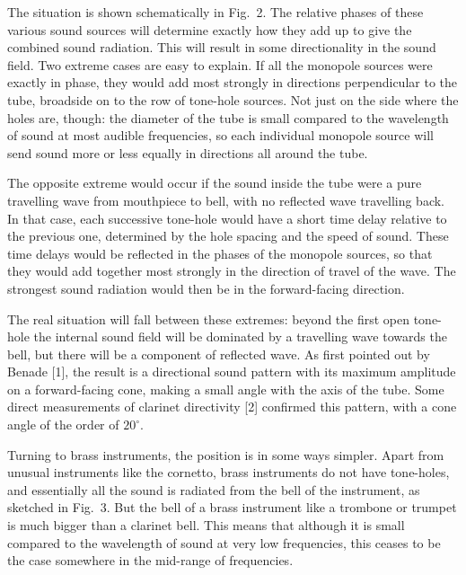   The situation is shown schematically in Fig.\ 2. The relative phases of these 
  various sound sources will determine exactly how they add up to give the 
  combined sound radiation. This will result in some directionality in the 
  sound field. Two extreme cases are easy to explain. If all the monopole 
  sources were exactly in phase, they would add most strongly in directions 
  perpendicular to the tube, broadside on to the row of tone-hole sources. Not 
  just on the side where the holes are, though: the diameter of the tube is 
  small compared to the wavelength of sound at most audible frequencies, so 
  each individual monopole source will send sound more or less equally in 
  directions all around the tube. 

  The opposite extreme would occur if the sound inside the tube were a pure 
  travelling wave from mouthpiece to bell, with no reflected wave travelling 
  back. In that case, each successive tone-hole would have a short time delay 
  relative to the previous one, determined by the hole spacing and the speed of 
  sound. These time delays would be reflected in the phases of the monopole 
  sources, so that they would add together most strongly in the direction of 
  travel of the wave. The strongest sound radiation would then be in the 
  forward-facing direction. 

  The real situation will fall between these extremes: beyond the first open 
  tone-hole the internal sound field will be dominated by a travelling wave 
  towards the bell, but there will be a component of reflected wave. As first 
  pointed out by Benade [1], the result is a directional sound pattern with its 
  maximum amplitude on a forward-facing cone, making a small angle with the 
  axis of the tube. Some direct measurements of clarinet directivity [2] 
  confirmed this pattern, with a cone angle of the order of $20^\circ$. 

  Turning to brass instruments, the position is in some ways simpler. Apart 
  from unusual instruments like the cornetto, brass instruments do not have 
  tone-holes, and essentially all the sound is radiated from the bell of the 
  instrument, as sketched in Fig.\ 3. But the bell of a brass instrument like a 
  trombone or trumpet is much bigger than a clarinet bell. This means that 
  although it is small compared to the wavelength of sound at very low 
  frequencies, this ceases to be the case somewhere in the mid-range of 
  frequencies. 

